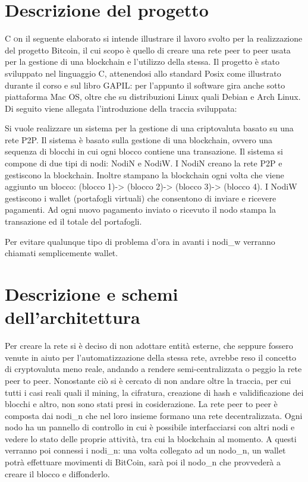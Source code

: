 \documentclass[a4paper,10pt]{report}
\begin{document}
  \chapter{Descrizione del progetto}
	\lettrine[lraise=0.1]{C }on il seguente elaborato si intende illustrare il lavoro svolto per la realizzazione del progetto Bitcoin, il cui scopo è quello di creare una rete peer to peer usata per la gestione di una blockchain e l'utilizzo della stessa. Il progetto è stato sviluppato nel linguaggio C, attenendosi allo standard Posix come illustrato durante il corso e sul libro GAPIL: per l'appunto il software gira anche sotto piattaforma Mac OS, oltre che su distribuzioni Linux quali Debian e Arch Linux. \newline \newline Di seguito viene allegata l'introduzione della traccia sviluppata: \begin{framed} Si vuole realizzare un sistema per la gestione di una criptovaluta basato su una rete P2P. Il sistema è basato sulla gestione di una blockchain, ovvero una sequenza di blocchi in cui ogni blocco contiene una transazione. Il sistema si compone di due tipi di nodi: NodiN e NodiW. I NodiN creano la rete P2P e gestiscono la blockchain. Inoltre stampano la blockchain ogni volta che viene aggiunto un blocco: (blocco 1)-> (blocco 2)-> (blocco 3)-> (blocco 4). I NodiW gestiscono i wallet (portafogli virtuali) che consentono di inviare e ricevere pagamenti. Ad ogni nuovo pagamento inviato o ricevuto il nodo stampa la transazione ed il totale del portafogli. \end{framed}
	Per evitare qualunque tipo di problema d'ora in avanti i nodi\_w verranno chiamati semplicemente wallet.

  \chapter{Descrizione e schemi dell'architettura}
	Per creare la rete si è deciso di non adottare entità esterne, che seppure fossero venute in aiuto per l'automatizzazione della stessa rete, avrebbe reso il concetto di cryptovaluta meno reale, andando a rendere semi-centralizzata o peggio la rete peer to peer. Nonostante ciò si è cercato di non andare oltre la traccia, per cui tutti i casi reali quali il mining, la cifratura, creazione di hash e validificazione dei blocchi e altro, non sono stati presi in cosiderazione.\newline
	La rete peer to peer è composta dai nodi\_n che nel loro insieme formano una rete decentralizzata. Ogni nodo ha un pannello di controllo in cui è possibile interfacciarsi con altri nodi e vedere lo stato delle proprie attività, tra cui la blockchain al momento. A questi verranno poi connessi i nodi\_n: una volta collegato ad un nodo\_n, un wallet potrà effettuare movimenti di BitCoin, sarà poi il nodo\_n che provvederà a creare il blocco e diffonderlo.
\end{document}
